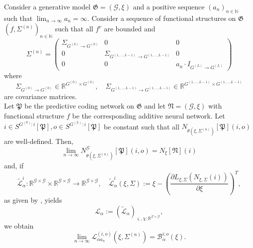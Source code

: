\documentclass[a4paper,11pt]{report}
\newcommand{\const}{\varsigma} %
\newcommand{\var}{\chi} %
\begin{document}
\begin{Pro}\label{the:prediback}
Consider a generative model $\mathfrak{G}=(\mathcal{G},\xi)$ and a positive sequence $(a_n)_{n\in\mathbb{N}}$ such that $\lim_{n\to\infty}a_n=\infty$. Consider a sequence of functional structures on $\mathfrak{G}$ $(f,\Sigma^{(n)})_{n\in\mathbb{N}}$ such that all $f^v$ are bounded and
\[
\Sigma^{(n)}=\begin{pmatrix}
\Sigma_{G^{(0)}\to G^{(0)}} & 0 & 0 \\
0 & \Sigma_{G^{(1,\dotsc, L-1)}\to G^{(1,\dotsc, L-1)}} & 0 \\
0 & 0 & a_n\cdot I_{G^{(L)}\to G^{(L)}}
\end{pmatrix}
\]
where
\[
\Sigma_{G^{(0)}\to G^{(0)}}\in\mathbb{R}^{G^{(0)}\times G^{(0)}}, 
\quad
\Sigma_{G^{(1,\dotsc, L-1)}\to G^{(1,\dotsc, L-1)}}\in\mathbb{R}^{G^{(1,\dotsc,L-1)}\times G^{(1,\dotsc,L-1)}}
\]
are covariance matrices.\\
Let $\mathfrak{P}$ be the predictive coding network on $\mathfrak{G}$ and let $\mathfrak{N}=(\mathcal{G},\xi)$ with functional structure $f$ be the corresponding additive neural network. Let $i\in S^{G^{(0)}:i}[\mathfrak{P}],o\in S^{G^{(L)}:i}[\mathfrak{P}]$ be constant such that all $N_{\theta(\xi,\Sigma^{(n)})}[\mathfrak{P}](i,o)$ are well-defined. Then,
\begin{equation}\label{eq:convadd}
\lim_{n\to\infty} N_{\theta(\xi,\Sigma^{(n)})}^{\mathcal{G}}[\mathfrak{P}](i,o)=N_{\xi}[\mathfrak{N}](i)
\end{equation}
and, if 
\[
\tilde{\mathcal{L}}^i_{\alpha}:\mathbb{R}^{\mathcal{G}\times\mathcal{G}}\times\mathbb{R}^{\mathcal{G}\times\mathcal{G}}\to\mathbb{R}^{\mathcal{G}\times\mathcal{G}},
\quad
\tilde{\mathcal{L}}_{\alpha}^i(\xi,\Sigma):=\xi-\left(\frac{\partial L_{\xi,\Sigma}(N_{\xi,\Sigma}(i))}{\partial\xi}\right)^T,
\]
as given by , yields
\[
\mathcal{L}_{\alpha}:=\left(\tilde{\mathcal{L}}_{\alpha}\right)_{\const,\var:\mathbb{R}^{\mathcal{G}\times\mathcal{G}}},
\]
we obtain
\begin{equation}\label{eq:prediback}
\lim_{n\to\infty}\mathcal{L}_{\alpha a_n}^{(i,o)}(\xi,\Sigma^{(n)})=\mathcal{B}_{\alpha}^{i;o}(\xi).
\end{equation}
\end{Pro}
\end{document}
